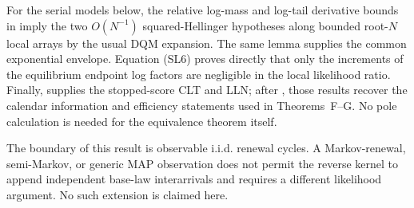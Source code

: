 For the serial models below, the relative log-mass and log-tail derivative
bounds in  imply the two
\(O(N^{-1})\) squared-Hellinger hypotheses along bounded root-\(N\) local
arrays by the usual DQM expansion.  The same lemma supplies the common
exponential envelope.  Equation \textup{(SL6)} proves directly that only the
increments of the equilibrium endpoint log factors are negligible in the
local likelihood ratio.  Finally,
 supplies the stopped-score CLT
and LLN; after , those
results recover the calendar information and efficiency statements used in
Theorems~F--G.  No pole calculation is needed for the equivalence theorem
itself.

The boundary of this result is observable i.i.d. renewal cycles.  A
Markov-renewal, semi-Markov, or generic MAP observation does not permit the
reverse kernel to append independent base-law interarrivals and requires a
different likelihood argument.  No such extension is claimed here.
